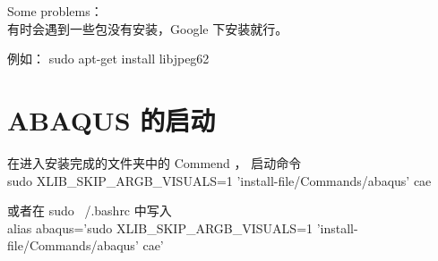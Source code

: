 \documentclass{article}
\begin{document}
	Some problems：\\
	有时会遇到一些包没有安装，Google 下安装就行。

	例如： sudo apt-get install libjpeg62

\section{ABAQUS 的启动} %
\label{sec:abaqus_start}
	在进入安装完成的文件夹中的 Commend ， 启动命令\\
	 sudo XLIB\_SKIP\_ARGB\_VISUALS=1 'install-file/Commands/abaqus' cae

	 或者在 sudo ~/.bashrc 中写入\\
	 alias abaqus='sudo XLIB\_SKIP\_ARGB\_VISUALS=1 'install-file/Commands/abaqus' cae'
\end{document}

